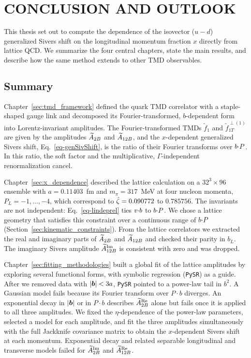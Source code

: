 \pagebreak

\section{CONCLUSION AND OUTLOOK}


\label{sec:conclusion}

This thesis set out to compute the dependence of the isovector ($u-d$) generalized Sivers shift on the longitudinal momentum fraction $x$ directly from lattice QCD. We summarize the four central chapters, state the main results, and describe how the same method extends to other TMD observables.

\subsection{Summary}
\label{sec:conclusion_summary}

Chapter~\ref{sec:tmd_framework} defined the quark TMD correlator with a staple-shaped gauge link and decomposed its Fourier-transformed, $b$-dependent form into Lorentz-invariant amplitudes. The Fourier-transformed TMDs $\tilde f_1$ and $\tilde f_{1T}^{\perp(1)}$ are given by the amplitudes $\widetilde{A}_{2B}$ and $\widetilde{A}_{12B}$, and the $x$-dependent generalized Sivers shift, Eq.~\eqref{eq-genSivShift}, is the ratio of their Fourier transforms over $b{\cdot} P$. In this ratio, the soft factor and the multiplicative, $\Gamma$-independent renormalization cancel.

Chapter~\ref{sec:x_dependence} described the lattice calculation on a $32^3\times96$ ensemble with $a=0.11403$~fm and $m_\pi=317$~MeV at four nucleon momenta, $P_L=-1,\ldots,-4$, which correspond to ${\hat \zeta}=0.090772$ to $0.785756$. The invariants are not independent: Eq.~\eqref{eq-lindeprel} ties $v{\cdot} b$ to $b{\cdot} P$. We chose a lattice geometry that satisfies this constraint over a continuous range of $b{\cdot} P$ (Section~\ref{sec:kinematic_constraints}). From the lattice correlators we extracted the real and imaginary parts of $\widetilde{A}_{2B}$ and $\widetilde{A}_{12B}$ and checked their parity in $b_L$. The imaginary Sivers amplitude $\widetilde{A}_{12B}^{\text{Im}}$ is consistent with zero and was dropped.

Chapter~\ref{sec:fitting_methodologies} built a global fit of the lattice amplitudes by exploring several functional forms, with symbolic regression (\texttt{PySR}) as a guide. After we removed data with $|\boldsymbol{b}|<3a$, \texttt{PySR} pointed to a power-law tail in $b^2$. A Gaussian model fails because its Fourier transform over $P\cdot b$ diverges. An exponential decay in $|\boldsymbol{b}|$ or in $P\cdot b$ describes $\widetilde{A}_{2B}^{\text{Re}}$ alone but fails once it is applied to all three amplitudes. We fixed the $\eta$-dependence of the power-law parameters, selected a model for each amplitude, and fit the three amplitudes simultaneously with the full Jackknife covariance matrix to obtain the $x$-dependent Sivers shift at each momentum. Exponential decay and related separable longitudinal and transverse models failed for $\widetilde{A}_{2B}^{\text{Im}}$ and $\widetilde{A}_{12B}^{\text{Re}}$.

